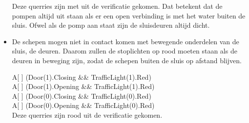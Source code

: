 \documentclass{article}
\begin{document}
\begin{itemize}
Deze querries zijn met {\color{green}{groen}} uit de verificatie gekomen. Dat betekent dat de pompen altijd uit staan als er een open verbinding is met het water buiten de sluis. Ofwel als de pomp aan staat zijn de sluisdeuren altijd dicht.

\item De schepen mogen niet in contact komen met bewegende onderdelen van de sluis, de deuren. Daarom zullen de stoplichten op rood moeten staan als de deuren in beweging zijn, zodat de schepen buiten de sluis op afstand blijven.

{\center
A[ ] (Door(1).Closing \&\& TrafficLight(1).Red)\\
A[ ] (Door(1).Opening \&\& TrafficLight(1).Red)\\
A[ ] (Door(0).Closing \&\& TrafficLight(0).Red)\\
A[ ] (Door(0).Opening \&\& TrafficLight(0).Red)\\
}
Deze querries zijn {\color{red}rood} uit de verificatie gekomen. 
\end{itemize}


\clearpage %
\end{document}
